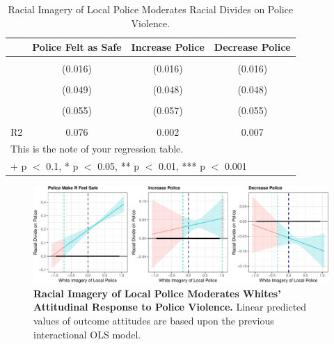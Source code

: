 \documentclass[
  11pt,
]{article}
\begin{document}
\hypertarget{tbl-divides}{}
\begin{table}
\caption{\label{tbl-divides}Racial Imagery of Local Police Moderates Racial Divides on Police
Violence. }\tabularnewline

\centering
\begin{tabular}[t]{lccc}
\toprule
  & Police Felt as Safe & Increase Police & Decrease Police\\
\midrule
\cellcolor{gray!6}{Racial Divide} & \cellcolor{gray!6}{0.221***} & \cellcolor{gray!6}{0.048**} & \cellcolor{gray!6}{-0.072***}\\
 & (0.016) & (0.016) & (0.016)\\
\cellcolor{gray!6}{White Imagery of Police} & \cellcolor{gray!6}{-0.168***} & \cellcolor{gray!6}{0.003} & \cellcolor{gray!6}{0.018}\\
 & (0.049) & (0.048) & (0.048)\\
\cellcolor{gray!6}{Racial Divide × White Imagery} & \cellcolor{gray!6}{0.182**} & \cellcolor{gray!6}{0.019} & \cellcolor{gray!6}{-0.039}\\
 & (0.055) & (0.057) & (0.055)\\
\midrule
\cellcolor{gray!6}{Num.Obs.} & \cellcolor{gray!6}{39551} & \cellcolor{gray!6}{39597} & \cellcolor{gray!6}{39589}\\
R2 & 0.076 & 0.002 & 0.007\\
\bottomrule
\multicolumn{4}{l}{\rule{0pt}{1em}This is the note of your regression table.}\\
\multicolumn{4}{l}{\rule{0pt}{1em}+ p $<$ 0.1, * p $<$ 0.05, ** p $<$ 0.01, *** p $<$ 0.001}\\
\end{tabular}
\end{table}

\begin{figure}[t]

{\centering \includegraphics{paper_files/figure-pdf/fig-divides-1.pdf}

}

\caption{\label{fig-divides}\textbf{Racial Imagery of Local Police
Moderates Whites' Attitudinal Response to Police Violence.} Linear
predicted values of outcome attitudes are based upon the previous
interactional OLS model.}

\end{figure}
\end{document}
